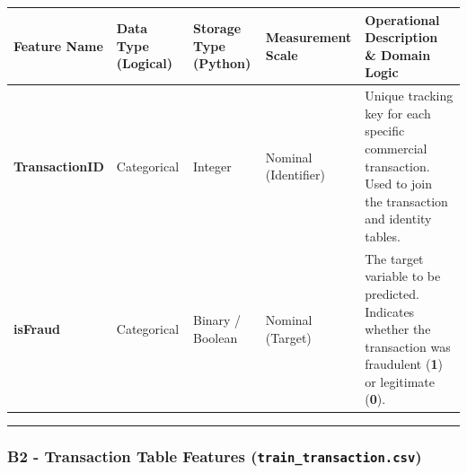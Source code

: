\documentclass[11pt]{article}
\begin{document}
{\def\LTcaptype{none} %
\begin{longtable}[]{@{}
  >{\raggedright\arraybackslash}p{}
  >{\raggedright\arraybackslash}p{}
  >{\raggedright\arraybackslash}p{}
  >{\raggedright\arraybackslash}p{}
  >{\raggedright\arraybackslash}p{}@{}}
\toprule\noalign{}
\begin{minipage}[b]{\linewidth}\raggedright
Feature Name
\end{minipage} & \begin{minipage}[b]{\linewidth}\raggedright
Data Type (Logical)
\end{minipage} & \begin{minipage}[b]{\linewidth}\raggedright
Storage Type (Python)
\end{minipage} & \begin{minipage}[b]{\linewidth}\raggedright
Measurement Scale
\end{minipage} & \begin{minipage}[b]{\linewidth}\raggedright
Operational Description \& Domain Logic
\end{minipage} \\
\midrule\noalign{}
\endhead
\bottomrule\noalign{}
\endlastfoot
\textbf{TransactionID} & Categorical & Integer & Nominal (Identifier) &
Unique tracking key for each specific commercial transaction. Used to
join the transaction and identity tables. \\
\textbf{isFraud} & Categorical & Binary / Boolean & Nominal (Target) &
The target variable to be predicted. Indicates whether the transaction
was fraudulent (\textbf{1}) or legitimate (\textbf{0}). \\
\end{longtable}
}

\begin{center}\rule{0.5\linewidth}{0.5pt}\end{center}

\subsubsection{\texorpdfstring{B2 - Transaction Table Features
(\texttt{train\_transaction.csv})}{B2 - Transaction Table Features (train\_transaction.csv)}}\label{b2---transaction-table-features-train_transaction.csv}
\end{document}
